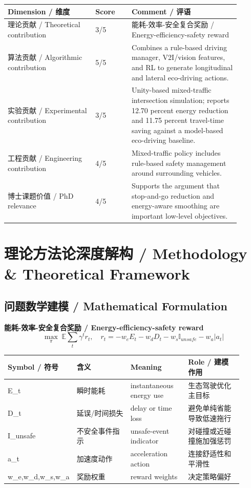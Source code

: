 \documentclass[UTF8,a4paper,11pt,fontset=fandol]{ctexart}
\begin{document}
\begin{longtable}{p{0.34\linewidth}p{0.14\linewidth}p{0.42\linewidth}}
\toprule
Dimension / 维度 & Score & Comment / 评语\\
\midrule
理论贡献 / Theoretical contribution & 3/5 & 能耗-效率-安全复合奖励 / Energy-efficiency-safety reward \\
算法贡献 / Algorithmic contribution & 5/5 & Combines a rule-based driving manager, V2I/vision features, and RL to generate longitudinal and lateral eco-driving actions. \\
实验贡献 / Experimental contribution & 3/5 & Unity-based mixed-traffic intersection simulation; reports 12.70 percent energy reduction and 11.75 percent travel-time saving against a model-based eco-driving baseline. \\
工程贡献 / Engineering contribution & 4/5 & Mixed-traffic policy includes rule-based safety management around surrounding vehicles. \\
博士课题价值 / PhD relevance & 4/5 & Supports the argument that stop-and-go reduction and energy-aware smoothing are important low-level objectives. \\
\bottomrule
\end{longtable}

\section{理论方法论深度解构 / Methodology \& Theoretical Framework}
\subsection{问题数学建模 / Mathematical Formulation}
\textbf{能耗-效率-安全复合奖励 / Energy-efficiency-safety reward}
\[
\max_{\pi}\; \mathbb{E}\sum_t \gamma^t r_t,\quad r_t= -w_e E_t-w_d D_t-w_s \mathbb{I}_{unsafe}-w_a |a_t|
\]
\begin{longtable}{p{0.16\linewidth}p{0.25\linewidth}p{0.25\linewidth}p{0.25\linewidth}}
\toprule
Symbol / 符号 & 含义 & Meaning & Role / 建模作用\\
\midrule
E\_t & 瞬时能耗 & instantaneous energy use & 生态驾驶优化主目标 \\
D\_t & 延误/时间损失 & delay or time loss & 避免单纯省能导致低速拖行 \\
I\_unsafe & 不安全事件指示 & unsafe-event indicator & 对碰撞或近碰撞施加强惩罚 \\
a\_t & 加速度动作 & acceleration action & 连接舒适性和平滑性 \\
w\_e,w\_d,w\_s,w\_a & 奖励权重 & reward weights & 决定策略偏好 \\
\bottomrule
\end{longtable}
\end{document}

